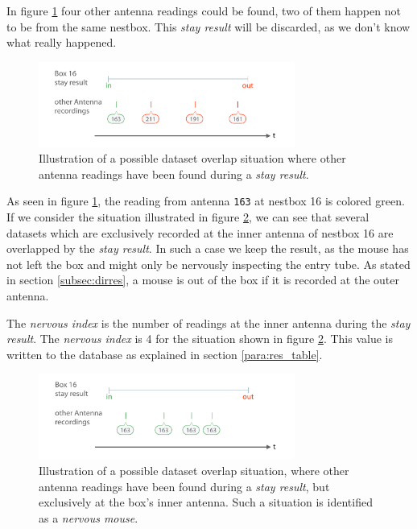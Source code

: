 In figure \ref{fig:dataset_overlap} four other antenna readings could be found, two of them happen not to be from the same nestbox. This \textit{stay result} will be discarded, as we don't know what really happened.

\begin{figure}[htpb]
\begin{center}
  \includegraphics[width=0.75\textwidth]{assets/pdf/dataset_overlap_schema.pdf}
  \caption[Dataset overlapping]{Illustration of a possible dataset overlap situation where other antenna readings have been found during a \textit{stay result}.}
  \label{fig:dataset_overlap}
\end{center}
\end{figure}

As seen in figure \ref{fig:dataset_overlap}, the reading from antenna \lstinline|163| at nestbox 16 is colored green. If we consider the situation illustrated in figure \ref{fig:dataset_overlap_nervous}, we can see that several datasets which are exclusively recorded at the inner antenna of nestbox 16 are overlapped by the \textit{stay result}. In such a case we keep the result, as the mouse has not left the box and might only be nervously inspecting the entry tube. As stated in section \ref{subsec:dirres}, a mouse is out of the box if it is recorded at the outer antenna. 

The \textit{nervous index} is the number of readings at the inner antenna during the \textit{stay result}. The \textit{nervous index} is 4 for the situation shown in figure \ref{fig:dataset_overlap_nervous}. This value is written to the database as explained in section \ref{para:res_table}.

\begin{figure}[htpb]
\begin{center}
  \includegraphics[width=0.75\textwidth]{assets/pdf/dataset_overlap_nervous_schema.pdf}
  \caption[\textit{Nervous mouse}]{Illustration of a possible dataset overlap situation, where other antenna readings have been found during a \textit{stay result}, but exclusively at the box's inner antenna. Such a situation is identified as a \textit{nervous mouse}.}
  \label{fig:dataset_overlap_nervous}
\end{center}
\end{figure}
 
